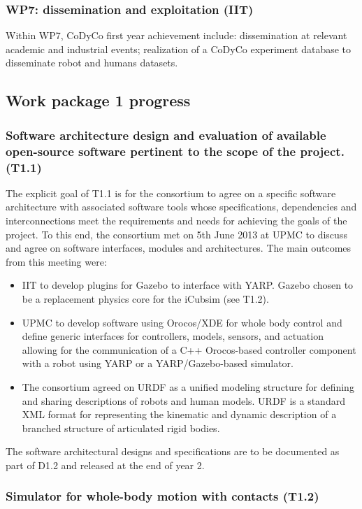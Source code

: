 \documentclass[12pt,a4paper,twoside]{article}
\begin{document}
\subsubsection{WP7: dissemination and exploitation (IIT)}

Within WP7, CoDyCo first year achievement include: dissemination at relevant academic and industrial events; realization of a CoDyCo experiment database to disseminate robot and humans datasets. 

\subsection{Work package 1 progress}

\subsubsection{Software architecture design and evaluation of available open-source software pertinent to the scope of the project. (T1.1)}

The explicit goal of T1.1 is for the consortium to agree on a specific software architecture with associated software tools whose specifications, dependencies and interconnections meet the requirements and needs for achieving the goals of the project.  To this end, the consortium met on 5th June 2013 at UPMC to discuss and agree on software interfaces, modules and architectures. The main outcomes from this meeting were: 
\begin{itemize}
\item IIT to develop plugins for Gazebo to interface with YARP. Gazebo chosen to be a replacement physics core for the iCubsim (see T1.2). 
\item UPMC to develop software using Orocos/XDE for whole body control and define generic interfaces for controllers, models, sensors, and actuation allowing for the communication of a C++ Orocos-based controller component with a robot using YARP or a YARP/Gazebo-based simulator.
\item  The consortium agreed on URDF as a unified modeling structure for defining and sharing descriptions of robots and human models. URDF is a standard XML format for representing the kinematic and dynamic description of a branched structure of articulated rigid bodies. 
\end{itemize}
The software architectural designs and specifications are to be documented as part of D1.2 and released at the end of year 2. 

\subsubsection{Simulator for whole-body motion with contacts (T1.2)}
\end{document}
